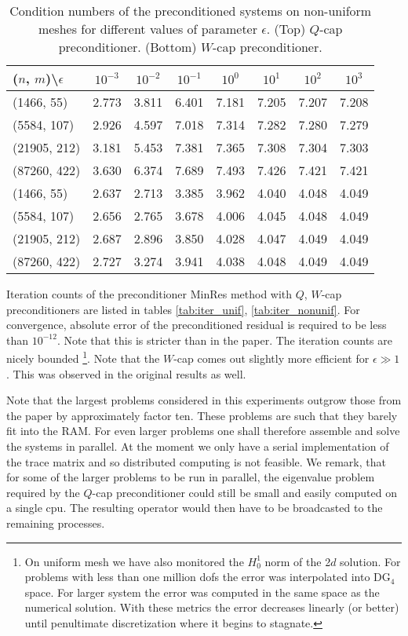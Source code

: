 \documentclass[10pt, a4paper]{article}
\begin{document}
%
\begin{table}[hb]
  \caption{Condition numbers of the preconditioned systems on non-uniform
  meshes for different values of parameter $\epsilon$. (Top) $Q$-cap
  preconditioner. (Bottom) $W$-cap preconditioner.
}
\label{tab:cond_nonunif}
\footnotesize{
\begin{tabular}{l|ccccccc}
\hline
($n$, $m$)\textbackslash $\epsilon$ & $10^{-3}$ & $10^{-2}$ & $10^{-1}$ & $10^{0}$ & $10^{1}$ & $10^{2}$ & $10^{3}$\\
\hline
(1466, 55) & 2.773 & 3.811 & 6.401 & 7.181 & 7.205 & 7.207 & 7.208\\
(5584, 107) & 2.926 & 4.597 & 7.018 & 7.314 & 7.282 & 7.280 & 7.279\\
(21905, 212) & 3.181 & 5.453 & 7.381 & 7.365 & 7.308 & 7.304 & 7.303\\
(87260, 422) & 3.630 & 6.374 & 7.689 & 7.493 & 7.426 & 7.421 & 7.421\\
\hline
\hline
(1466, 55) & 2.637 & 2.713 & 3.385 & 3.962 & 4.040 & 4.048 & 4.049\\
(5584, 107) & 2.656 & 2.765 & 3.678 & 4.006 & 4.045 & 4.048 & 4.049\\
(21905, 212) & 2.687 & 2.896 & 3.850 & 4.028 & 4.047 & 4.049 & 4.049\\
(87260, 422) & 2.727 & 3.274 & 3.941 & 4.038 & 4.048 & 4.049 & 4.049\\
\hline
\end{tabular}
}
\end{table}

Iteration counts of the preconditioner MinRes method with $Q$, $W$-cap preconditioners 
are listed in tables \ref{tab:iter_unif}, \ref{tab:iter_nonunif}. For convergence, 
absolute error of the preconditioned residual is required to be less than $10^{-12}$. 
Note that this is stricter than in the paper. The iteration counts are nicely bounded
\footnote{On uniform mesh we have also monitored the $H^1_0$ norm of the 2$d$ solution. 
For problems with less than one million dofs the error was interpolated into DG$_4$ 
space. For larger system the error was computed in the same space as the numerical 
solution. With these metrics the error decreases linearly (or better) until penultimate 
discretization where it begins to stagnate.}. Note
that the $W$-cap comes out slightly more efficient for $\epsilon\gg 1$. 
This was observed in the original results as well.

Note that the largest problems considered in this experiments outgrow those from 
the paper by approximately factor ten. These problems are such that they barely 
fit into the RAM. For even larger problems one shall therefore assemble and solve 
the systems in parallel. At the moment we only have a serial implementation of the 
trace matrix and so distributed computing is not feasible. We remark, that for 
some of the larger problems to be run in parallel, the eigenvalue problem required 
by the $Q$-cap preconditioner could still be small and easily computed on a single 
cpu. The resulting operator would then have to be broadcasted to the 
remaining processes.
\end{document}
